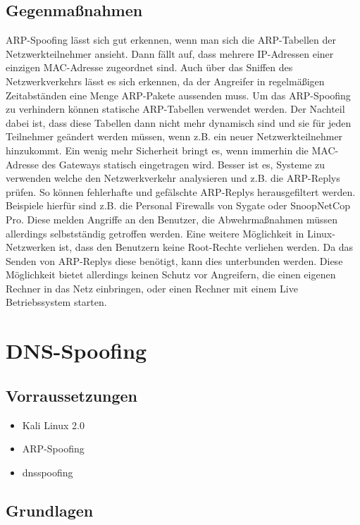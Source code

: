 \subsection{Gegenmaßnahmen}
ARP-Spoofing lässt sich gut erkennen, wenn man sich die ARP-Tabellen der Netzwerkteilnehmer ansieht. Dann fällt auf, dass mehrere IP-Adressen einer einzigen MAC-Adresse zugeordnet sind. Auch über das Sniffen des Netzwerkverkehrs lässt es sich erkennen, da der Angreifer in regelmäßigen Zeitabständen eine Menge ARP-Pakete aussenden muss.
Um das ARP-Spoofing zu verhindern können statische ARP-Tabellen verwendet werden. Der Nachteil dabei ist, dass diese Tabellen dann nicht mehr dynamisch sind und sie für jeden Teilnehmer geändert werden müssen, wenn z.B. ein neuer Netzwerkteilnehmer hinzukommt. Ein wenig mehr Sicherheit bringt es, wenn immerhin die MAC-Adresse des Gateways statisch eingetragen wird.
Besser ist es, Systeme zu verwenden welche den Netzwerkverkehr analysieren und z.B. die ARP-Replys prüfen. So können fehlerhafte und gefälschte ARP-Replys herausgefiltert werden. Beispiele hierfür sind z.B. die Personal Firewalls von Sygate oder SnoopNetCop Pro. Diese melden Angriffe an den Benutzer, die Abwehrmaßnahmen müssen allerdings selbstständig getroffen werden.
Eine weitere Möglichkeit in Linux-Netzwerken ist, dass den Benutzern keine Root-Rechte verliehen werden. Da das Senden von ARP-Replys diese benötigt, kann dies unterbunden werden. Diese Möglichkeit bietet allerdings keinen Schutz vor Angreifern, die einen eigenen Rechner in das Netz einbringen, oder einen Rechner mit einem Live Betriebssystem starten. 


\section{DNS-Spoofing}

\subsection*{Vorraussetzungen}

\begin{itemize}
\item Kali Linux 2.0
\item ARP-Spoofing
\item dnsspoofing
\end{itemize}


\subsection*{Grundlagen}

